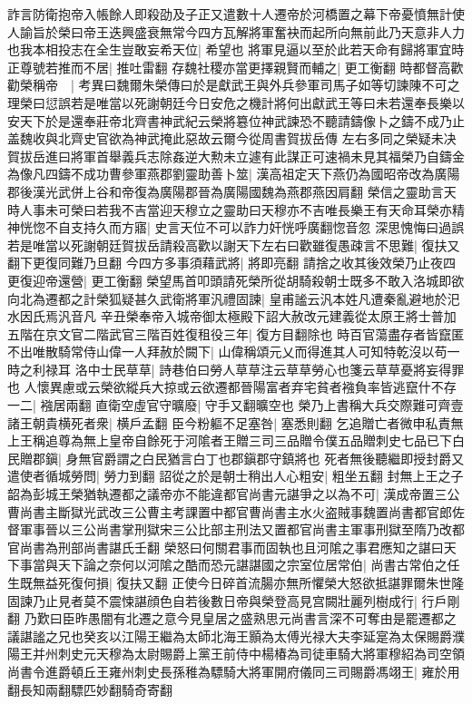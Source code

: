 詐言防衛抱帝入帳餘人即殺劭及子正又遣數十人遷帝於河橋置之幕下帝憂憤無計使人諭旨於榮曰帝王迭興盛衰無常今四方瓦解將軍奮袂而起所向無前此乃天意非人力也我本相投志在全生豈敢妄希天位|{
	希望也}
將軍見逼以至於此若天命有歸將軍宜時正尊號若推而不居|{
	推吐雷翻}
存魏社稷亦當更擇親賢而輔之|{
	更工衡翻}
時都督高歡勸榮稱帝　|{
	考異曰魏爾朱榮傳曰於是獻武王與外兵參軍司馬子如等切諫陳不可之理榮曰愆誤若是唯當以死謝朝廷今日安危之機計將何出獻武王等曰未若還奉長樂以安天下於是還奉莊帝北齊書神武紀云榮將簒位神武諫恐不聽請鑄像卜之鑄不成乃止盖魏收與北齊史官欲為神武掩此惡故云爾今從周書賀拔岳傳}
左右多同之榮疑未决賀拔岳進曰將軍首舉義兵志除姦逆大勲未立遽有此謀正可速禍未見其福榮乃自鑄金為像凡四鑄不成功曹參軍燕郡劉靈助善卜筮|{
	漢高祖定天下燕仍為國昭帝改為廣陽郡後漢光武併上谷和帝復為廣陽郡晉為廣陽國魏為燕郡燕因肩翻}
榮信之靈助言天時人事未可榮曰若我不吉當迎天穆立之靈助曰天穆亦不吉唯長樂王有天命耳榮亦精神恍惚不自支持久而方寤|{
	史言天位不可以詐力奸恍呼廣翻惚音忽}
深思愧悔曰過誤若是唯當以死謝朝廷賀拔岳請殺高歡以謝天下左右曰歡雖復愚疎言不思難|{
	復扶又翻下更復同難乃旦翻}
今四方多事須藉武將|{
	將即亮翻}
請捨之收其後效榮乃止夜四更復迎帝還營|{
	更工衡翻}
榮望馬首叩頭請死榮所從胡騎殺朝士既多不敢入洛城即欲向北為遷都之計榮狐疑甚久武衛將軍汎禮固諫|{
	皇甫謐云汎本姓凡遭秦亂避地於汜水因氏焉汎音凡}
辛丑榮奉帝入城帝御太極殿下詔大赦改元建義從太原王將士普加五階在京文官二階武官三階百姓復租役三年|{
	復方目翻除也}
時百官蕩盡存者皆竄匿不出唯散騎常侍山偉一人拜赦於闕下|{
	山偉稱頌元乂而得進其人可知特乾沒以苟一時之利禄耳}
洛中士民草草|{
	詩巷伯曰勞人草草注云草草勞心也箋云草草憂將妄得罪也}
人懷異慮或云榮欲縱兵大掠或云欲遷都晉陽富者弃宅貧者襁負率皆逃竄什不存一二|{
	襁居兩翻}
直衛空虛官守曠廢|{
	守手又翻曠空也}
榮乃上書稱大兵交際難可齊壹諸王朝貴横死者衆|{
	横戶孟翻}
臣今粉軀不足塞咎|{
	塞悉則翻}
乞追贈亡者微申私責無上王稱追尊為無上皇帝自餘死于河隂者王贈三司三品贈令僕五品贈刺史七品已下白民贈郡鎭|{
	身無官爵謂之白民猶言白丁也郡鎭郡守鎮將也}
死者無後聽繼即授封爵又遣使者循城勞問|{
	勞力到翻}
詔從之於是朝士稍出人心粗安|{
	粗坐五翻}
封無上王之子韶為彭城王榮猶執遷都之議帝亦不能違都官尚書元諶爭之以為不可|{
	漢成帝置三公曹尚書主斷獄光武改三公曹主考課置中都官曹尚書主水火盗賊事魏置尚書都官郎佐督軍事晉以三公尚書掌刑獄宋三公比部主刑法又置都官尚書主軍事刑獄至隋乃改都官尚書為刑部尚書諶氏壬翻}
榮怒曰何關君事而固執也且河隂之事君應知之諶曰天下事當與天下論之奈何以河隂之酷而恐元諶諶國之宗室位居常伯|{
	尚書古常伯之任}
生既無益死復何損|{
	復扶又翻}
正使今日碎首流腸亦無所懼榮大怒欲抵諶罪爾朱世隆固諫乃止見者莫不震悚諶顔色自若後數日帝與榮登高見宫闕壯麗列樹成行|{
	行戶剛翻}
乃歎曰臣昨愚闇有北遷之意今見皇居之盛熟思元尚書言深不可奪由是罷遷都之議諶謐之兄也癸亥以江陽王繼為太師北海王顥為太傅光禄大夫李延寔為太保賜爵濮陽王并州刺史元天穆為太尉賜爵上黨王前侍中楊椿為司徒車騎大將軍穆紹為司空領尚書令進爵頓丘王雍州刺史長孫稚為驃騎大將軍開府儀同三司賜爵馮翊王|{
	雍於用翻長知兩翻驃匹妙翻騎奇寄翻}
